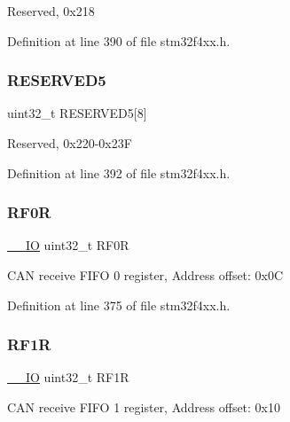 Reserved, 0x218 

Definition at line 390 of file stm32f4xx.\+h.

\mbox{\label{struct_c_a_n___type_def_a269f31b91d0f38a48061b76ecc346f55}} 
\subsubsection{\texorpdfstring{R\+E\+S\+E\+R\+V\+E\+D5}{RESERVED5}}
{\footnotesize\ttfamily uint32\+\_\+t R\+E\+S\+E\+R\+V\+E\+D5\mbox{[}8\mbox{]}}

Reserved, 0x220-\/0x23F 

Definition at line 392 of file stm32f4xx.\+h.

\mbox{\label{struct_c_a_n___type_def_accf4141cee239380d0ad4634ee21dbf6}} 
\subsubsection{\texorpdfstring{R\+F0R}{RF0R}}
{\footnotesize\ttfamily \hyperlink{group___c_m_s_i_s__core__definitions_gaec43007d9998a0a0e01faede4133d6be}{\+\_\+\+\_\+\+IO} uint32\+\_\+t R\+F0R}

C\+AN receive F\+I\+FO 0 register, Address offset\+: 0x0C 

Definition at line 375 of file stm32f4xx.\+h.

\mbox{\label{struct_c_a_n___type_def_a02b589bb589df4f39e549dca4d5abb08}} 
\subsubsection{\texorpdfstring{R\+F1R}{RF1R}}
{\footnotesize\ttfamily \hyperlink{group___c_m_s_i_s__core__definitions_gaec43007d9998a0a0e01faede4133d6be}{\+\_\+\+\_\+\+IO} uint32\+\_\+t R\+F1R}

C\+AN receive F\+I\+FO 1 register, Address offset\+: 0x10 

